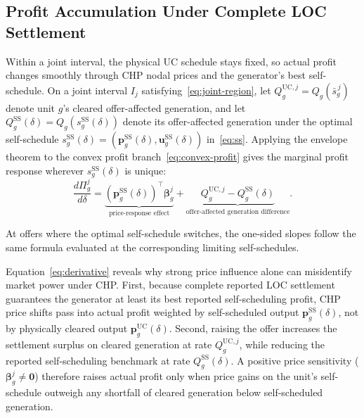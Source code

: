 \documentclass[journal]{IEEEtran}
\newcommand{\bp}{\bm p}
\newcommand{\bu}{\bm u}
\newcommand{\UC}{\mathrm{UC}}
\newcommand{\SSched}{\mathrm{SS}}
\begin{document}
\subsection{Profit Accumulation Under Complete LOC Settlement}
Within a joint interval, the physical UC schedule stays fixed, so actual profit changes smoothly through CHP nodal prices and the generator's best self-schedule. On a joint interval $I_j$ satisfying~\eqref{eq:joint-region}, let $Q_g^{\UC,j}=Q_g(\bar{s}_g^{\,j})$ denote unit $g$'s cleared offer-affected generation, and let $Q_g^{\SSched}(\delta)=Q_g(s_g^{\SSched}(\delta))$ denote its offer-affected generation under the optimal self-schedule $s_g^{\SSched}(\delta)=(\bp_g^{\SSched}(\delta),\bu_g^{\SSched}(\delta))$ in~\eqref{eq:ss}. Applying the envelope theorem to the convex profit branch~\eqref{eq:convex-profit} gives the marginal profit response wherever $s_g^{\SSched}(\delta)$ is unique:
\begin{equation}
\frac{d\Pi_g^j}{d\delta}
=
\underbrace{(\bp_g^{\SSched}(\delta))^\top\bm{\beta}_g^j}_{\text{price-response effect}}
+
\underbrace{Q_g^{\UC,j} - Q_g^{\SSched}(\delta)}_{\text{offer-affected generation difference}}.
\label{eq:derivative}
\end{equation}

At offers where the optimal self-schedule switches, the one-sided slopes follow the same formula evaluated at the corresponding limiting self-schedules.

Equation~\eqref{eq:derivative} reveals why strong price influence alone can misidentify market power under CHP. First, because complete reported LOC settlement guarantees the generator at least its best reported self-scheduling profit, CHP price shifts pass into actual profit weighted by self-scheduled output $\bp_g^{\SSched}(\delta)$, not by physically cleared output $\bp_g^{\UC}(\delta)$. Second, raising the offer increases the settlement surplus on cleared generation at rate $Q_g^{\UC,j}$, while reducing the reported self-scheduling benchmark at rate $Q_g^{\SSched}(\delta)$. A positive price sensitivity ($\bm{\beta}_g^j\neq\bm{0}$) therefore raises actual profit only when price gains on the unit's self-schedule outweigh any shortfall of cleared generation below self-scheduled generation.
\end{document}
